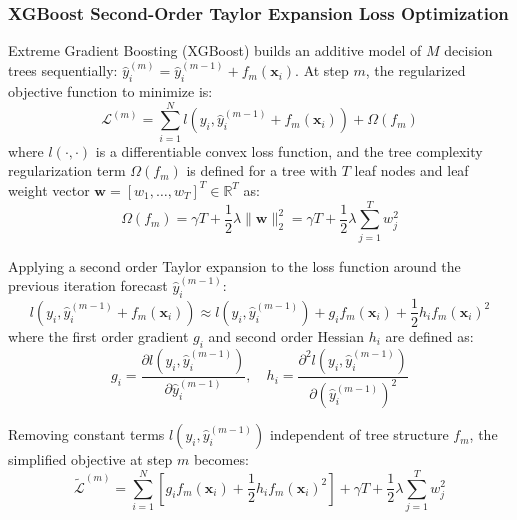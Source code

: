\subsubsection{XGBoost Second-Order Taylor Expansion Loss Optimization}
Extreme Gradient Boosting (XGBoost) \citep{chen2016xgboost} builds an additive model of $M$ decision trees sequentially: $\hat{y}_i^{(m)} = \hat{y}_i^{(m-1)} + f_m(\mathbf{x}_i)$. At step $m$, the regularized objective function to minimize is:
\begin{equation}
\mathcal{L}^{(m)} = \sum_{i=1}^N l\left( y_i, \hat{y}_i^{(m-1)} + f_m(\mathbf{x}_i) \right) + \Omega(f_m)
\label{eq:ch4_xgb_obj}
\end{equation}
where $l(\cdot, \cdot)$ is a differentiable convex loss function, and the tree complexity regularization term $\Omega(f_m)$ is defined for a tree with $T$ leaf nodes and leaf weight vector $\mathbf{w} = [w_1, \dots, w_T]^T \in \mathbb{R}^T$ as:
\begin{equation}
\Omega(f_m) = \gamma T + \frac{1}{2} \lambda \|\mathbf{w}\|_2^2 = \gamma T + \frac{1}{2} \lambda \sum_{j=1}^T w_j^2
\label{eq:ch4_xgb_reg}
\end{equation}

Applying a second order Taylor expansion to the loss function around the previous iteration forecast $\hat{y}_i^{(m-1)}$:
\begin{equation}
l\left( y_i, \hat{y}_i^{(m-1)} + f_m(\mathbf{x}_i) \right) \approx l\left( y_i, \hat{y}_i^{(m-1)} \right) + g_i f_m(\mathbf{x}_i) + \frac{1}{2} h_i f_m(\mathbf{x}_i)^2
\label{eq:ch4_taylor_loss}
\end{equation}
where the first order gradient $g_i$ and second order Hessian $h_i$ are defined as:
\begin{equation}
g_i = \frac{\partial l\left( y_i, \hat{y}_i^{(m-1)} \right)}{\partial \hat{y}_i^{(m-1)}}, \quad h_i = \frac{\partial^2 l\left( y_i, \hat{y}_i^{(m-1)} \right)}{\partial \left(\hat{y}_i^{(m-1)}\right)^2}
\label{eq:ch4_grad_hessian}
\end{equation}

Removing constant terms $l(y_i, \hat{y}_i^{(m-1)})$ independent of tree structure $f_m$, the simplified objective at step $m$ becomes:
\begin{equation}
\tilde{\mathcal{L}}^{(m)} = \sum_{i=1}^N \left[ g_i f_m(\mathbf{x}_i) + \frac{1}{2} h_i f_m(\mathbf{x}_i)^2 \right] + \gamma T + \frac{1}{2} \lambda \sum_{j=1}^T w_j^2
\label{eq:ch4_xgb_simplified_obj}
\end{equation}


